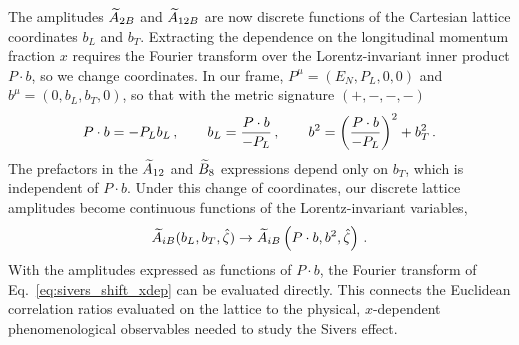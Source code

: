 The amplitudes $\widetilde{A}_{2B}$ and $\widetilde{A}_{12B}$ are now discrete functions of the Cartesian lattice coordinates $b_L$ and $b_T$. Extracting the dependence on the longitudinal momentum fraction $x$ requires the Fourier transform over the Lorentz-invariant inner product $P\cdot b$, so we change coordinates. In our frame, $P^\mu=(E_N,P_L,0,0)$ and $b^\mu=(0,b_L,b_T,0)$, so that with the metric signature $(+,-,-,-)$
\begin{equation}
    P\cdot b=-P_Lb_L\,,\qquad b_L=\frac{P\cdot b}{-P_L}\,,\qquad b^2=\left(\frac{P\cdot b}{-P_L}\right)^2+b_T^2\,.
    \label{eq:pb_minus_pl_bl}
\end{equation}
The prefactors in the $\widetilde{A}_{12}$ and $\widetilde{B}_8$ expressions depend only on $b_T$, which is independent of $P\cdot b$. Under this change of coordinates, our discrete lattice amplitudes become continuous functions of the Lorentz-invariant variables,
\begin{equation}
    \widetilde{A}_{iB}(b_L, b_T, \hat{\zeta}) \to \widetilde{A}_{iB}\left( P \cdot b, b^2, \hat{\zeta} \right)\,.
\end{equation}
With the amplitudes expressed as functions of $P\cdot b$, the Fourier transform of Eq.~\eqref{eq:sivers_shift_xdep} can be evaluated directly. This connects the Euclidean correlation ratios evaluated on the lattice to the physical, $x$-dependent phenomenological observables needed to study the Sivers effect.
